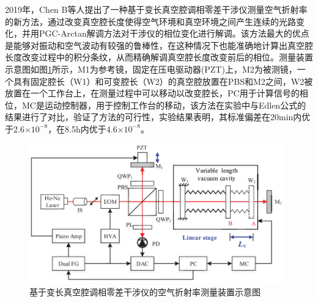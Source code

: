 2019年，Chen B等人提出了一种基于变长真空腔调相零差干涉仪测量空气折射率的新方法，通过改变真空腔长度使得空气环境和真空环境之间产生连续的光路变化，并用PGC-Arctan解调方法对干涉仪的相位变化进行解调。该方法最大的优点是能够对振动和空气波动有较强的鲁棒性，在这种情况下也能准确地计算出真空腔长度改变过程中的积分条纹，从而精确解调真空腔长度改变前后的相位。测量装置示意图如图\ref{fig:基于变长真空腔调相零差干涉仪的空气折射率测量装置示意图}所示\cite{2019Precision}，M1为参考镜，固定在压电驱动器(PZT)上，M2为被测镜，一个具有固定腔长（W1）和可变腔长（W2）的真空腔放置在PBS和M2之间，W2被放置在一个工作台上，在测量过程中可以移动以改变腔长，PC用于计算信号的相位，MC是运动控制器，用于控制工作台的移动，该方法在实验中与Edlen公式的结果进行了对比，验证了方法的可行性，实验结果表明，其标准偏差在20min内优于2.6$\times 10^{-8}$，在8.5h内优于4.6$\times 10^{-8}$。
\begin{figure}[htb]
  \centering
  \includegraphics[width=11cm]{fig/1-fig/基于变长真空腔调相零差干涉仪的空气折射率测量装置图.png}
  \caption{基于变长真空腔调相零差干涉仪的空气折射率测量装置示意图}
  \label{fig:基于变长真空腔调相零差干涉仪的空气折射率测量装置示意图}
\end{figure}


